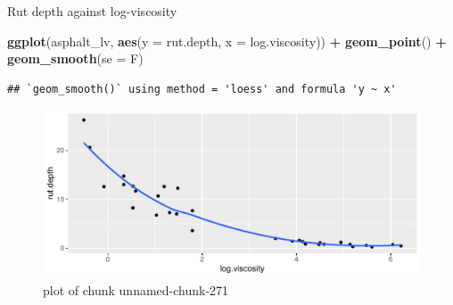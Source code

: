 \documentclass[ignorenonframetext,]{beamer}
\newenvironment{Shaded}{\begin{snugshade}}{\end{snugshade}}
\newcommand{\DataTypeTok}[1]{\textcolor[rgb]{0.13,0.29,0.53}{#1}}
\newcommand{\KeywordTok}[1]{\textcolor[rgb]{0.13,0.29,0.53}{\textbf{#1}}}
\newcommand{\NormalTok}[1]{#1}
\newcommand{\OperatorTok}[1]{\textcolor[rgb]{0.81,0.36,0.00}{\textbf{#1}}}
\newcommand{\StringTok}[1]{\textcolor[rgb]{0.31,0.60,0.02}{#1}}
\begin{document}
\begin{frame}[fragile]{Rut depth against log-viscosity}
\protect\hypertarget{rut-depth-against-log-viscosity}{}

\begin{Shaded}
\begin{Highlighting}[]
\KeywordTok{ggplot}\NormalTok{(asphalt_lv, }\KeywordTok{aes}\NormalTok{(}\DataTypeTok{y =}\NormalTok{ rut.depth, }\DataTypeTok{x =}\NormalTok{ log.viscosity)) }\OperatorTok{+}
\StringTok{  }\KeywordTok{geom_point}\NormalTok{() }\OperatorTok{+}\StringTok{ }\KeywordTok{geom_smooth}\NormalTok{(}\DataTypeTok{se =}\NormalTok{ F)}
\end{Highlighting}
\end{Shaded}

\begin{verbatim}
## `geom_smooth()` using method = 'loess' and formula 'y ~ x'
\end{verbatim}

\begin{figure}
\centering
\includegraphics{figure/unnamed-chunk-271-1.pdf}
\caption{plot of chunk unnamed-chunk-271}
\end{figure}

\end{frame}
\end{document}

